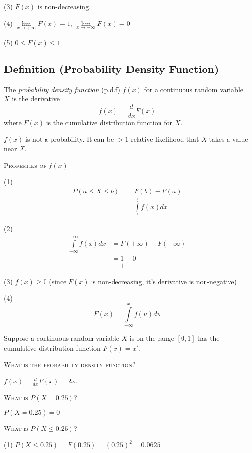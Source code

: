 (3) $ F(x) $ is non-decreasing.

(4) $ \lim\limits_{{x} \to {+\infty}} F(x)=1 $,
$ \lim\limits_{{x} \to {-\infty}} F(x)=0 $

(5) $ 0\le F(x)\le 1 $

\begin{defbox}
    \subsection{Definition (Probability Density Function)}
    The \emph{probability density function} (p.d.f) $ f(x) $ for a continuous
    random variable $ X $ is the derivative
    \[ f(x)=\frac{d}{dx}F(x) \]
    where $ F(x) $ is the cumulative distribution function for $ X $.
\end{defbox}

\begin{remark}
    $ f(x) $ is not a probability. It can be $ >1 $ relative
    likelihood that $ X $ takes a value near $ X $.
\end{remark}

\textsc{Properties of $ f(x) $}

(1)
\begin{align*}
    P(a\le X\le b)&=F(b)-F(a)\\
    &=\int\limits_{a}^{b} f(x) d{x}
\end{align*}

(2)
\begin{align*}
    \int\limits_{-\infty}^{+\infty} f(x) d{x}&=F(+\infty)-F(-\infty)\\
    &=1-0\\
    &=1
\end{align*}

(3) $ f(x)\ge 0 $ (since $ F(x) $ is non-decreasing, it's derivative is non-negative)

(4) \[ F(x)=\int\limits_{-\infty}^{x} f(u) d{u} \]


Suppose a continuous random variable $ X $ is on the range $ [0,1] $ has the 
cumulative distribution function $ F(x)=x^2 $.

\textsc{What is the probability density function?}

$ f(x)=\frac{d}{dx} F(x)=2x $.

\textsc{What is $ P(X=0.25) $?}

$ P(X=0.25)=0 $

\textsc{What is $ P(X\le 0.25) $?}

(1) $ P(X\le 0.25)=F(0.25)=(0.25)^2=0.0625 $

